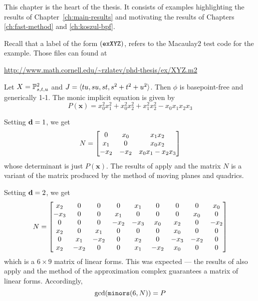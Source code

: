 \documentclass[fleqn,reqno]{amsart}
\begin{document}



\begin{paragraf*}
This chapter is the heart of the thesis.
It consists of examples highlighting the results of Chapter~\ref{ch:main-results}
and motivating the results of Chapters \ref{ch:fast-method} and \ref{ch:koszul-bpf}.

Recall that a label of the form $(\mathop{\tt exXYZ})$, refers to the Macaulay2 test code for the example.
Those files can found at
\begin{center}
\url{http://www.math.cornell.edu/~rzlatev/phd-thesis/ex/XYZ.m2}
\end{center}
\end{paragraf*}



\begin{example}[$\mt{ex301}$]
\label{ex301}
Let $X=\mathbb{P}^2_{s,t,u}$ and $J=\langle tu,su,st,s^2+t^2+u^2\rangle$.
Then $\phi$ is basepoint-free and generically 1-1.
The monic implicit equation is given by
\[
	P(\mathbf x)={x}_{0}^{2} {x}_{1}^{2}+{x}_{0}^{2} {x}_{2}^{2}+{x}_{1}^{2}
	{x}_{2}^{2}-{x}_{0} {x}_{1} {x}_{2} {x}_{3}
\]

Setting $\mathbf d=1$, we get
\[
	N=
	\bgroup\begin{bmatrix}0&
      {x}_{0}&
      {x}_{1} {x}_{2}\\
      {x}_{1}&
      0&
      {x}_{0} {x}_{2}\\
      {-{x}_{2}}&
      {-{x}_{2}}&
      {x}_{0} {x}_{1}-{x}_{2} {x}_{3}\\
      \end{bmatrix}\egroup
\]
whose determinant is just $P(\mathbf x)$.
The results of \citet{CGZ-00} apply and the matrix $N$ is a variant of the matrix
produced by the method of moving planes and quadrics.

Setting $\mathbf d=2$, we get
\[
	N=
	\bgroup\begin{bmatrix}{x}_{2}&
	      0&
	      0&
	      0&
	      {x}_{1}&
	      0&
	      0&
	      0&
	      {x}_{0}\\
	      {-{x}_{3}}&
	      0&
	      0&
	      {x}_{1}&
	      0&
	      0&
	      0&
	      {x}_{0}&
	      0\\
	      0&
	      0&
	      0&
	      {-{x}_{2}}&
	      {-{x}_{3}}&
	      {x}_{0}&
	      {x}_{2}&
	      0&
	      {-{x}_{2}}\\
	      {x}_{2}&
	      0&
	      {x}_{1}&
	      0&
	      0&
	      0&
	      {x}_{0}&
	      0&
	      0\\
	      0&
	      {x}_{1}&
	      {-{x}_{2}}&
	      0&
	      {x}_{2}&
	      0&
	      {-{x}_{3}}&
	      {-{x}_{2}}&
	      0\\
	      {x}_{2}&
	      {-{x}_{2}}&
	      0&
	      0&
	      {x}_{1}&
	      {-{x}_{2}}&
	      {x}_{0}&
	      0&
	      0\\
	      \end{bmatrix}\egroup
\]
which is a $6\times9$ matrix of linear forms.
This was expected --- the results of \cite{BJ-03} also apply and the method
of the approximation complex guarantees a matrix of linear forms.
Accordingly,
\[
	\gcd(\mathop{\tt minors}(6,N))=P
\]


\end{example}
\end{document}
